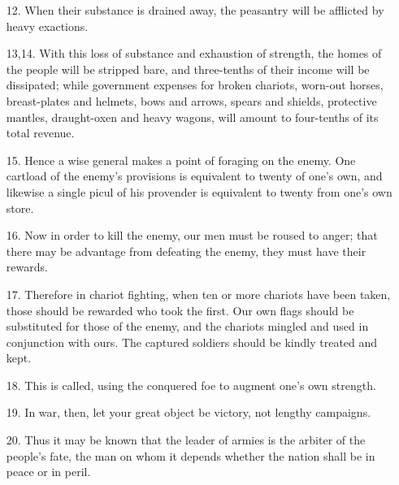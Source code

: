 \documentclass[11pt,openany]{memoir}
\newcommand{\enumeratemargin}{1.30em}
\begin{document}
\begin{enumerate}[leftmargin=\enumeratemargin]
\item[12.] When their substance is drained away, the peasantry will be afflicted by heavy exactions.
\item[13,14.] With this loss of substance and exhaustion of strength, the homes of the people will be stripped bare, and three-tenths of their income will be dissipated; while government expenses for broken chariots, worn-out horses, breast-plates and helmets, bows and arrows, spears and shields, protective mantles, draught-oxen and heavy wagons, will amount to four-tenths of its total revenue.
\item[15.] Hence a wise general makes a point of foraging on the enemy. One cartload of the enemy's provisions is equivalent to twenty of one's own, and likewise a single picul of his provender is equivalent to twenty from one's own store.
\item[16.] Now in order to kill the enemy, our men must be roused to anger; that there may be advantage from defeating the enemy, they must have their rewards.
\item[17.] Therefore in chariot fighting, when ten or more chariots have been taken, those should be rewarded who took the first. Our own flags should be substituted for those of the enemy, and the chariots mingled and used in conjunction with ours. The captured soldiers should be kindly treated and kept.
\item[18.] This is called, using the conquered foe to augment one's own strength.
\item[19.] In war, then, let your great object be victory, not lengthy campaigns.
\item[20.] Thus it may be known that the leader of armies is the arbiter of the people's fate, the man on whom it depends whether the nation shall be in peace or in peril.
\end{enumerate}
\end{document}
